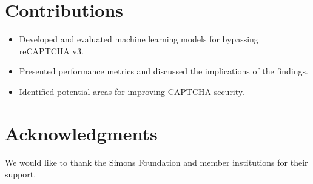 \documentclass{article}
\begin{document}
\section{Contributions}
\begin{itemize}
    \item Developed and evaluated machine learning models for bypassing reCAPTCHA v3.
    \item Presented performance metrics and discussed the implications of the findings.
    \item Identified potential areas for improving CAPTCHA security.
\end{itemize}

\section*{Acknowledgments}
We would like to thank the Simons Foundation and member institutions for their support.



\end{document}
